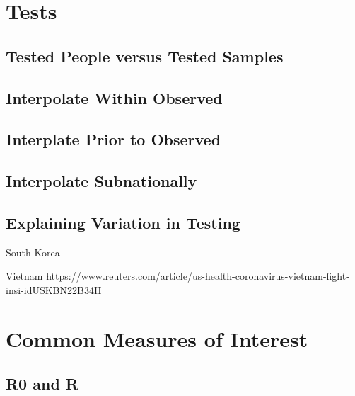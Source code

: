 \documentclass[
]{book}
\begin{document}
\hypertarget{tests}{%
\chapter{Tests}\label{tests}}

\hypertarget{tested-people-versus-tested-samples}{%
\section{Tested People versus Tested Samples}\label{tested-people-versus-tested-samples}}

\hypertarget{interpolate-within-observed}{%
\section{Interpolate Within Observed}\label{interpolate-within-observed}}

\hypertarget{interplate-prior-to-observed}{%
\section{Interplate Prior to Observed}\label{interplate-prior-to-observed}}

\hypertarget{interpolate-subnationally}{%
\section{Interpolate Subnationally}\label{interpolate-subnationally}}

\hypertarget{explaining-variation-in-testing}{%
\section{Explaining Variation in Testing}\label{explaining-variation-in-testing}}

South Korea

Vietnam
\url{https://www.reuters.com/article/us-health-coronavirus-vietnam-fight-insi-idUSKBN22B34H}

\hypertarget{common-measures-of-interest}{%
\chapter{Common Measures of Interest}\label{common-measures-of-interest}}

\hypertarget{r0-and-r}{%
\section{R0 and R}\label{r0-and-r}}
\end{document}

